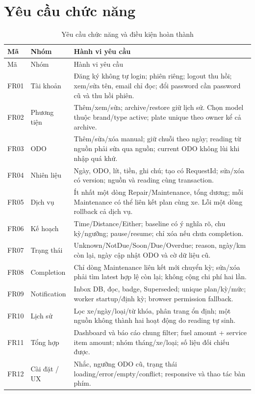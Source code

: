 \section{Yêu cầu chức năng}
\begin{smalltable}\begin{longtable}{L{1.2cm}L{3.1cm}L{10.3cm}}
\caption{Yêu cầu chức năng và điều kiện hoàn thành}\label{tab:fr}\\
\toprule Mã & Nhóm & Hành vi yêu cầu\\\midrule\endfirsthead
\toprule Mã & Nhóm & Hành vi yêu cầu\\\midrule\endhead
FR01 & Tài khoản & Đăng ký không tự login; phiên riêng; logout thu hồi; xem/sửa tên, email chỉ đọc; đổi password cần password cũ và thu hồi phiên.\\
FR02 & Phương tiện & Thêm/xem/sửa; archive/restore giữ lịch sử. Chọn model thuộc brand/type active; plate unique theo owner kể cả archive.\\
FR03 & ODO & Thêm/sửa/xóa manual; giữ chuỗi theo ngày; reading từ nguồn phải sửa qua nguồn; current ODO không lùi khi nhập quá khứ.\\
FR04 & Nhiên liệu & Ngày, ODO, lít, tiền, ghi chú; tạo có RequestId; sửa/xóa có version; nguồn và reading cùng transaction.\\
FR05 & Dịch vụ & Ít nhất một dòng Repair/Maintenance, tổng dương; mỗi Maintenance có thể liên kết plan cùng xe. Lỗi một dòng rollback cả dịch vụ.\\
FR06 & Kế hoạch & Time/Distance/Either; baseline có ý nghĩa rõ, chu kỳ/ngưỡng; pause/resume; chỉ xóa nếu chưa completion.\\
FR07 & Trạng thái & Unknown/NotDue/Soon/Due/Overdue; reason, ngày/km còn lại, ngày cập nhật ODO và cờ dữ liệu cũ.\\
FR08 & Completion & Chỉ dòng Maintenance liên kết mới chuyển kỳ; sửa/xóa phải tìm latest hợp lệ còn lại; không cộng chi phí hai lần.\\
FR09 & Notification & Inbox DB, đọc, badge, Superseded; unique plan/kỳ/mức; worker startup/định kỳ; browser permission fallback.\\
FR10 & Lịch sử & Lọc xe/ngày/loại/từ khóa, phân trang ổn định; một nguồn không thành hai hoạt động do reading tự sinh.\\
FR11 & Tổng hợp & Dashboard và báo cáo chung filter; fuel amount + service item amount; nhóm tháng/xe/loại; số liệu đối chiếu được.\\
FR12 & Cài đặt / UX & Nhắc, ngưỡng ODO cũ, trạng thái loading/error/empty/conflict; responsive và thao tác bàn phím.\\\bottomrule
\end{longtable}\end{smalltable}

